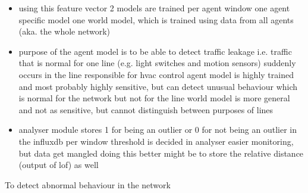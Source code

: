 \begin{itemize}
	\item using this feature vector 2 models are trained per agent window
		\subitem one agent specific model
		\subitem one world model, which is trained using data from all agents (aka. the whole network)
	\item purpose of the agent model is to be able to detect traffic leakage
		\subitem i.e. traffic that is normal for one line (e.g. light switches and motion sensors) suddenly occurs in the line responsible for \gls{hvac} control
		\subitem agent model is highly trained and most probably highly sensitive, but can detect unusual behaviour which is normal for the network but not for the line
		\subitem world model is more general and not as sensitive, but cannot distinguish between purposes of lines
	\item analyser module stores 1 for being an outlier or 0 for not being an outlier in the \gls{influxdb} per window
		\subitem threshold is decided in analyser
		\subitem easier monitoring, but data get mangled doing this
		\subitem better might be to store the relative distance (output of \gls{lof}) as well
	
\end{itemize}

To detect abnormal behaviour in the network 